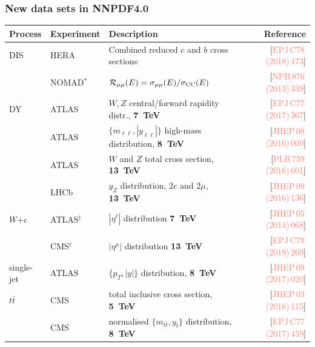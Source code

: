 \documentclass{beamer}
\begin{document}
\begin{frame}
 \frametitle{New data sets in NNPDF4.0}
 \tiny
 \vspace{0.1cm}
 \begin{tabularx}{\textwidth}{llXr}
 \toprule
 Process    & Experiment & Description                                         & Reference\\
 \midrule
 DIS        
            & HERA        & Combined reduced $c$ and $b$ cross sections                      & [{\textcolor{salmon}{EPJ\,C78\,(2018)\,473}}]\\
            & NOMAD$^*$   & $\mathcal{R}_{\mu\mu}(E)=\sigma_{\mu\mu}(E)/\sigma_{\rm CC}(E)$  & [{\textcolor{salmon}{NPB\,876\,(2013)\,339}}]\\
 DY         
            & ATLAS       & $W,Z$ central/forward rapidity distr., {\bf 7~TeV}    & [{\textcolor{salmon}{EPJ\,C77\,(2017)\,367}}]\\
            & ATLAS       & $\{m_{\ell\ell},|y_{\ell\ell}|\}$ high-mass distribution, {\bf 8~TeV} & [{\textcolor{salmon}{JHEP\,08\,(2016)\,009}}]\\
            & ATLAS       & $W$ and $Z$ total cross section, {\bf 13~TeV}                    & [{\textcolor{salmon}{PLB\,759\,(2016)\,601}}]\\
            & LHCb        & $y_Z$ distribution, $2e$ and $2\mu$, {\bf 13~TeV}                & [{\textcolor{salmon}{JHEP\,09\,(2016)\,136}}]\\  
 $W$+c 
            & ATLAS$^\dag$& $|\eta^\ell|$ distribution  {\bf 7~TeV}                          & [{\textcolor{salmon}{JHEP\,05\,(2014)\,068}}]\\
            & CMS$^\dag$  & $|\eta^\mu|$ distribution  {\bf 13~TeV}                          & [{\textcolor{salmon}{EPJ\,C79\,(2019)\,269}}]\\ 
 single-jet 
            & ATLAS       & $\{p_T, |y|\}$ distribution, {\bf 8~TeV}                         & [{\textcolor{salmon}{JHEP\,09\,(2017)\,020}}]\\
 $t\bar{t}$ 
            & CMS         & total inclusive cross section, {\bf 5~TeV}                       & [{\textcolor{salmon}{JHEP\,03\,(2018)\,115}}]\\
            & CMS         & normalised $\{m_{t\bar{t}},y_t\}$ distribution, {\bf 8~TeV}      & [{\textcolor{salmon}{EPJ\,C77\,(2017)\,459}}]\\

\end{tabularx}
\end{frame}
\end{document}
